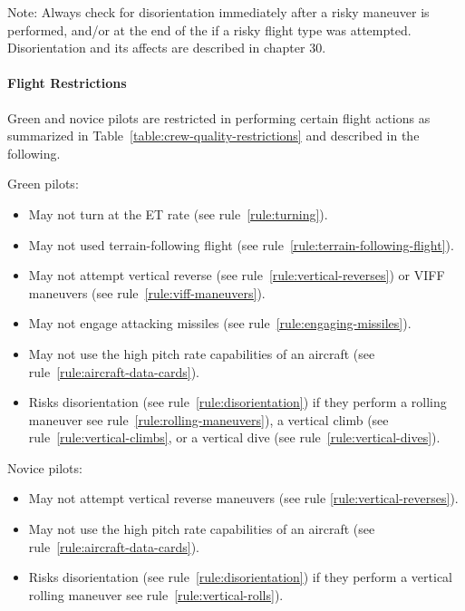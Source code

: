 \begin{advancedrules}
{Note: Always check for disorientation immediately after a risky maneuver is performed, and/or at the end of the  if a risky flight type was attempted. Disorientation and its affects are described in chapter 30.

}{
\paragraph{Flight Restrictions}


Green and novice pilots are restricted in performing certain flight actions as summarized in Table~\ref{table:crew-quality-restrictions} and described in the following.

Green pilots:
\begin{itemize}
    \item May not turn at the ET rate (see rule~\ref{rule:turning}).
    \item May not used terrain-following flight (see rule~\ref{rule:terrain-following-flight}).
    \item May not attempt vertical reverse (see rule~\ref{rule:vertical-reverses}) or VIFF maneuvers (see rule~\ref{rule:viff-maneuvers}).
    \item May not engage attacking missiles (see rule~\ref{rule:engaging-missiles}).
    \item May not use the high pitch rate capabilities of an aircraft (see rule~\ref{rule:aircraft-data-cards}).
    \item Risks disorientation (see rule~\ref{rule:disorientation}) 
    if they perform a rolling maneuver see rule~\ref{rule:rolling-maneuvers}), a vertical climb (see rule~\ref{rule:vertical-climbs}, or a vertical dive (see rule~\ref{rule:vertical-dives}).
\end{itemize}

Novice pilots:

\begin{itemize}
    \item May not attempt vertical reverse maneuvers (see rule \ref{rule:vertical-reverses}).
    \item May not use the high pitch rate capabilities of an aircraft (see rule~\ref{rule:aircraft-data-cards}).
   \item Risks disorientation (see rule~\ref{rule:disorientation}) 
    if they perform a vertical rolling maneuver see rule~\ref{rule:vertical-rolls}).
\end{itemize}

}
\end{advancedrules}
